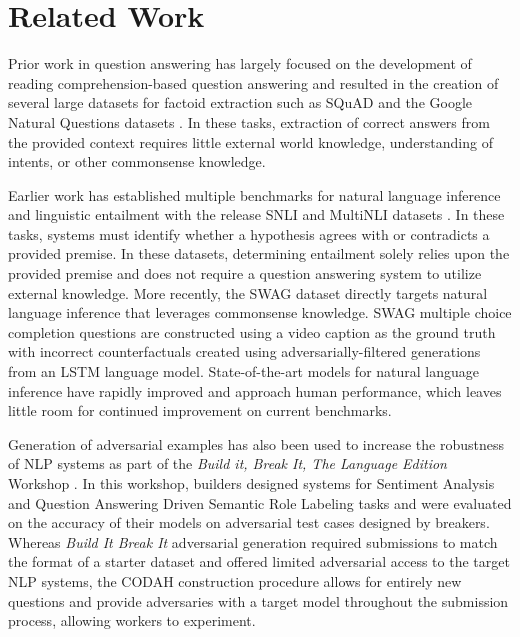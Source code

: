 \documentclass[11pt,a4paper]{article}
\begin{document}
\section{Related Work}
    Prior work in question answering has largely focused on the development of reading comprehension-based question answering and resulted in the creation of several large datasets for factoid extraction such as SQuAD \cite{rajpurkar2016squad, P18-2124} and the Google Natural Questions datasets  \cite{47761}. In these tasks, extraction of correct answers from the provided context requires little external world knowledge, understanding of intents, or other commonsense knowledge. 
    
    Earlier work has established multiple benchmarks for natural language inference and linguistic entailment with the release SNLI \cite{bowman2015large} and MultiNLI datasets \cite{williams2018broad}. In these tasks, systems must identify whether a hypothesis agrees with or contradicts a provided premise. In these datasets, determining entailment solely relies upon the provided premise and does not require a question answering system to utilize external knowledge. More recently, the SWAG dataset \cite{zellers2018swag} directly targets natural language inference that leverages commonsense knowledge. SWAG multiple choice completion questions are constructed using a video caption as the ground truth with incorrect counterfactuals created using adversarially-filtered generations from an LSTM language model.  State-of-the-art models for natural language inference have rapidly improved and approach human performance, which leaves little room for continued improvement on current benchmarks. 
    
    Generation of adversarial examples has also been used to increase the robustness of NLP systems as part of the \textit{Build it, Break It, The Language Edition} Workshop \cite{ettinger2017towards}. In this workshop, builders designed systems for Sentiment Analysis and Question Answering Driven Semantic Role Labeling tasks and were evaluated on the accuracy of their models on adversarial test cases designed by breakers. Whereas \textit{Build It Break It} adversarial generation required submissions to match the format of a starter dataset and offered limited adversarial access to the target NLP systems, the CODAH construction procedure allows for entirely new questions and provide adversaries with a target model throughout the submission process, allowing workers to experiment.
\end{document}
